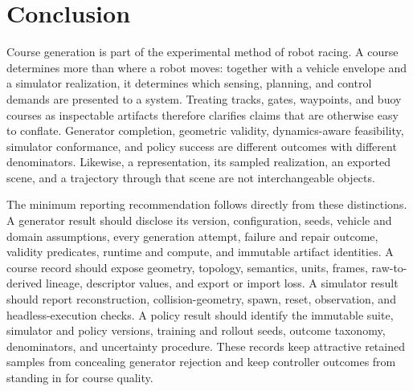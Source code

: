 \section{Conclusion}
\label{sec:conclusion}

Course generation is part of the experimental method of robot racing. A course
determines more than where a robot moves: together with a vehicle envelope and a
simulator realization, it determines which sensing, planning, and control demands are
presented to a system. Treating tracks, gates, waypoints, and buoy courses as
inspectable artifacts therefore clarifies claims that are otherwise easy to conflate.
Generator completion, geometric validity, dynamics-aware feasibility, simulator
conformance, and policy success are different outcomes with different denominators.
Likewise, a representation, its sampled realization, an exported scene, and a
trajectory through that scene are not interchangeable objects.

The minimum reporting recommendation follows directly from these distinctions. A
generator result should disclose its version, configuration, seeds, vehicle and domain
assumptions, every generation attempt, failure and repair outcome, validity predicates,
runtime and compute, and immutable artifact identities. A course record should expose
geometry, topology, semantics, units, frames, raw-to-derived lineage, descriptor
values, and export or import loss. A simulator result should report reconstruction,
collision-geometry, spawn, reset, observation, and headless-execution checks. A policy
result should identify the immutable suite, simulator and policy versions, training
and rollout seeds, outcome taxonomy, denominators, and uncertainty procedure. These
records keep attractive retained samples from concealing generator rejection and keep
controller outcomes from standing in for course quality.

